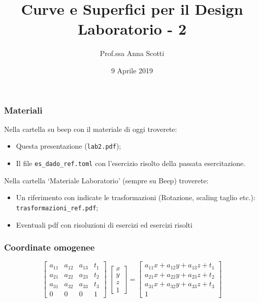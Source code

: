\documentclass{beamer}
\title[Curve e Sup. - Lab 2]{Curve e Superfici per il Design \\ Laboratorio - 2}
\author[Prof.ssa Scotti]{Prof.ssa Anna Scotti}
\date{9 Aprile 2019}
\begin{document}
\begin{frame}
\maketitle
\end{frame}
\begin{frame}
\frametitle{Materiali}
Nella cartella su beep con il materiale di oggi troverete:
\begin{itemize}
\item Questa presentazione (\texttt{lab2.pdf});
\item Il file \texttt{es\_dado\_ref.toml} con l'esercizio risolto della passata esercitazione.
\end{itemize}
Nella cartella `Materiale Laboratorio' (sempre su Beep) troverete:
\begin{itemize}
\item Un riferimento con indicate le trasformazioni (Rotazione, scaling taglio etc.): \texttt{trasformazioni\_ref.pdf};
\item Eventuali pdf con risoluzioni di esercizi ed esercizi risolti
\end{itemize}
\end{frame}
\begin{frame}
\frametitle{Coordinate omogenee}
\begin{displaymath}
\begin{bmatrix}
a_{11} & a_{12} & a_{13} & t_1 \\
a_{21} & a_{22} & a_{23} & t_2 \\
a_{31} & a_{32} & a_{33} & t_3 \\
0      &    0   &  0     & 1 
\end{bmatrix}
~\begin{bmatrix}
x \\ y\\ z\\ 1
\end{bmatrix}
=  
\begin{bmatrix}
a_{11}x + a_{12}y + a_{13}z + t_1 \\
a_{21}x + a_{22}y + a_{23}z + t_2 \\
a_{31}x + a_{32}y + a_{33}z + t_3 \\
 1
\end{bmatrix}
\end{displaymath}
\end{frame}
\end{document}
